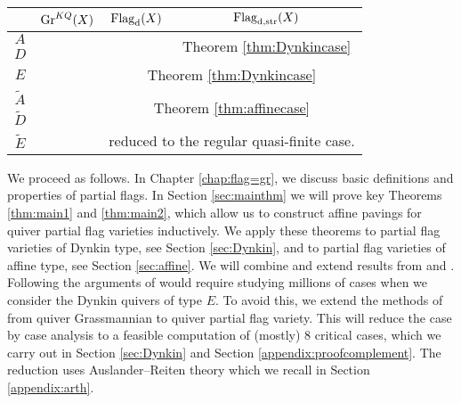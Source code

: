 \begingroup
\renewcommand{\arraystretch}{1.3}
\begin{table}[ht]
\centering
\vspace{0.5cm}
\begin{tabular}{|c|c|c|c|}
\hline
            & $\operatorname{Gr}^{KQ}(X)$                  & $\operatorname{\operatorname{Flag}_{d}}(X)$                          & $\operatorname{\operatorname{Flag}_{d,\operatorname{str}}}(X)$          \\ \hline
$A$         & \multirow{3}{*}{\cite[Section 5]{irelli2019cell}} & \multirow{2}{*}{\cite[Theorem 2.20]{maksimau2019flag}}        & \multirow{2}{*}{Theorem \ref{thm:Dynkincase}}       \\ \cline{1-1}
$D$         &                            &                                      &                         \\ \cline{1-1} \cline{3-4} 
$E$         &                            & \multicolumn{2}{c|}{Theorem \ref{thm:Dynkincase}}                                          \\ \hline
$\tilde{A}$ & \multirow{3}{*}{\cite[Section 6]{irelli2019cell}} & \multicolumn{2}{c|}{\multirow{2}{*}{Theorem \ref{thm:affinecase}}}                         \\ \cline{1-1}
$\tilde{D}$ &                            & \multicolumn{2}{c|}{}                                          \\ \cline{1-1} \cline{3-4} 
$\tilde{E}$ &                            & \multicolumn{2}{c|}{reduced to the regular quasi-finite case.} \\ \hline
\end{tabular}
\vspace{1mm}
\caption{}\label{table:result}
\end{table}
\endgroup
We proceed as follows. In Chapter \ref{chap:flag=gr}, we discuss basic definitions and properties of partial flags. In Section \ref{sec:mainthm} we will prove key Theorems \ref{thm:main1} and \ref{thm:main2}, which allow us to construct affine pavings for quiver partial flag varieties inductively. We apply these theorems to partial flag varieties of Dynkin type, see Section \ref{sec:Dynkin}, and to partial flag varieties of affine type, see Section \ref{sec:affine}. We will combine and extend results from \cite{irelli2019cell} and \cite{maksimau2019flag}.
Following the arguments of \cite{maksimau2019flag} would require studying millions of cases when we  consider the Dynkin quivers of type $E$. To avoid this, we extend the methods of \cite{irelli2019cell} from quiver Grassmannian to quiver partial flag variety. This will reduce the case by case analysis to a feasible computation of (mostly) 8 critical cases, which we carry out in Section \ref{sec:Dynkin} and Section \ref{appendix:proofcomplement}. The reduction uses Auslander--Reiten theory which we recall in Section \ref{appendix:arth}.
